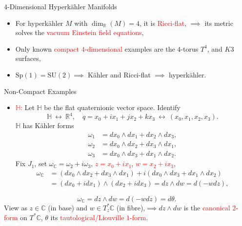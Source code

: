 \begin{frame}{$4$-Dimensional Hyperk\"ahler Manifolds}
    \begin{itemize}
        \item For hyperk\"ahler $M$ with $\dim_{\mathbb{R}}(M) = 4$, it is \textcolor{red}{Ricci-flat}, \break $\implies$ its metric solves the \textcolor{red}{vacuum Einstein field equations},
        \item Only known \textcolor{red}{compact $4$-dimensional} examples are the $4$-torus $T^{4}$, and $K3$ surfaces,
        \item $\text{Sp}(1) = \text{SU}(2) \implies$ K\"ahler and Ricci-flat $\implies$ hyperk\"ahler.
    \end{itemize}
\end{frame}

\begin{frame}{Non-Compact Examples}
    \begin{itemize}
        \item \textcolor{red}{$\mathbb{H}$:} Let $\mathbb{H}$ be the flat quaternionic vector space. Identify
        \[
            \mathbb{H}\ \longleftrightarrow\ \mathbb{R}^{4}, \quad q = x_{0} + ix_{1} + jx_{2} + kx_{3}\ \longleftrightarrow\ (x_{0}, x_{1}, x_{2}, x_{3}).
        \]
        $\mathbb{H}$ has K\"ahler forms
        \begin{align*}
            \omega_{1} &= dx_{0} \wedge dx_{1} + dx_{2} \wedge dx_{3}, \\
            \omega_{2} &= dx_{0} \wedge dx_{2} + dx_{3} \wedge dx_{1}, \\
            \omega_{3} &= dx_{0} \wedge dx_{3} + dx_{1} \wedge dx_{2}.
        \end{align*}
        Fix $J_{1}$, set $\omega_{\mathbb{C}} = \omega_{2} + i\omega_{3}$, \textcolor{red}{$z = x_{0} + ix_{1}$}, \textcolor{red}{$w = x_{2} + ix_{3}$},
        \begin{align*}
            \omega_{\mathbb{C}} &= (dx_{0} \wedge dx_{2} + dx_{3} \wedge dx_{1}) + i(dx_{0} \wedge dx_{3} + dx_{1} \wedge dx_{2}) \\
            &= (dx_{0} + idx_{1}) \wedge (dx_{2} + i dx_{3}) = dz \wedge dw = d(-wdz),
        \end{align*}
    \end{itemize}
\end{frame}

\begin{frame}
    \[
        \omega_{\mathbb{C}} = dz \wedge dw = d(-wdz) = d\theta.
    \]
    View as $z\in \mathbb{C}$ (in base) and $w \in T_{z}^{\ast}\mathbb{C}$ (in fibre),\break $\implies dz \wedge dw$ is the \textcolor{red}{canonical $2$-form} on $T^{\ast}\mathbb{C}$, \break $\theta$ its \textcolor{red}{tautological/Liouville $1$-form}.
\end{frame}